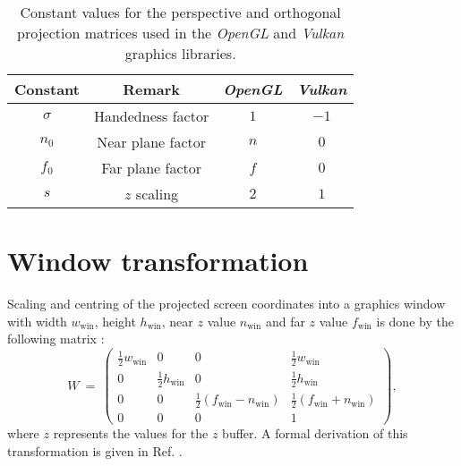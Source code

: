 \begin{table}[htb]
	\centering
	\begin{tabular}{|c|ccc|}
		\hline
		    Constant & Remark             &  \textit{OpenGL} &   \textit{Vulkan} \tabularnewline
		\hline
		    $\sigma$ & Handedness factor  &              $1$ &              $-1$ \tabularnewline
		       $n_0$ & Near plane factor  &              $n$ &               $0$ \tabularnewline
		       $f_0$ & Far plane factor   &              $f$ &               $0$ \tabularnewline
		         $s$ & $z$ scaling        &              $2$ &               $1$ \tabularnewline
		\hline
	\end{tabular}
	\caption[Projection matrix constants.]{
		Constant values for the perspective and orthogonal projection matrices used in the
		\textit{OpenGL} \cite{web_OpenGL} and \textit{Vulkan} \cite{web_Vulkan} graphics libraries.}
	\label{tab:gl_constants}
\end{table}



\section{Window transformation}
\label{sec:gl_viewport}
Scaling and centring of the projected screen coordinates into a graphics window with 
width $w_{\mathrm{win}}$, height $h_{\mathrm{win}}$, 
near $z$ value $n_{\mathrm{win}}$ and far $z$ value $f_{\mathrm{win}}$ is done by the 
following matrix \cite{web_gl_viewport}:
\begin{equation}
	W \ =\ 
	\left( \begin{array}{cccc} 
		\frac{1}{2} w_{\mathrm{win}} &                              0 &                                                          0 &                              \frac{1}{2} w_{\mathrm{win}} \\
		                           0 &   \frac{1}{2} h_{\mathrm{win}} &                                                          0 &                               \frac{1}{2} h_{\mathrm{win}} \\
		                           0 &                              0 & \frac{1}{2} \left(f_{\mathrm{win}}-n_{\mathrm{win}}\right) & \frac{1}{2} \left(f_{\mathrm{win}}+n_{\mathrm{win}}\right) \\
		                           0 &                              0 &                                                          0 &                                                          1
	\end{array} \right),
\end{equation}
where $z$ represents the values for the $z$ buffer.
A formal derivation of this transformation is given in Ref. \cite{web_webgl_viewport}.



